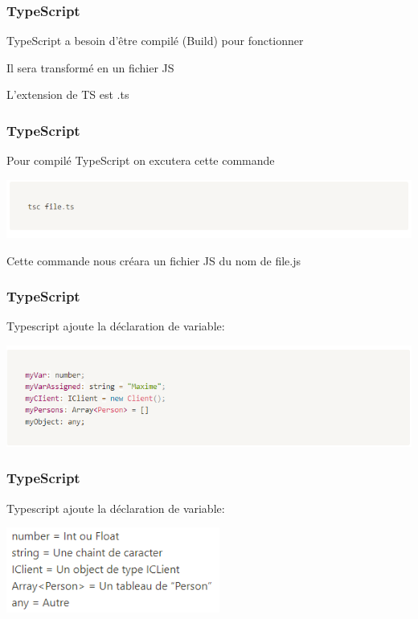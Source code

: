 \documentclass[10pt]{beamer}
\begin{document}
	\begin{frame}
		\frametitle{TypeScript}

		TypeScript a besoin d’être compilé (Build) pour fonctionner  \newline \newline

		Il sera transformé en un fichier JS  \newline \newline

		L’extension de TS est .ts

	\end{frame}

	\begin{frame}
		\frametitle{TypeScript}

		Pour compilé TypeScript on excutera cette commande \newline \newline


		\includegraphics[width=15cm]{assets/tsbuild}\newline


		Cette commande nous créara un fichier JS du nom de file.js

	\end{frame}

	\begin{frame}
		\frametitle{TypeScript}

		Typescript ajoute la déclaration de variable: \newline \newline


		\includegraphics[width=15cm]{assets/tsvariable}\newline


	\end{frame}

	\begin{frame}
		\frametitle{TypeScript}

		Typescript ajoute la déclaration de variable: \newline \newline

		\centering
		\includegraphics[width=7cm]{assets/tsvariable2}\newline


	\end{frame}
\end{document}
